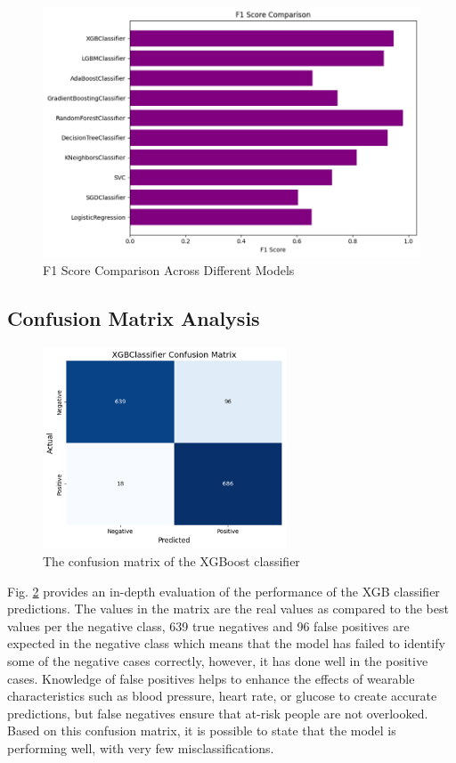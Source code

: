 \documentclass[conference]{IEEEtran}
\begin{document}
\begin{figure}[h]
\centerline{
\includegraphics[width=0.5 \textwidth]{Picture3.png}}
\caption{F1 Score Comparison Across Different Models}
\label{fig:2}
\end{figure}

\subsection{\textbf{Confusion Matrix Analysis}}


\begin{figure}[h]
\centerline{
\includegraphics[height=6cm, width=0.5 \textwidth]{Picture4.png}}
\caption{The confusion matrix of the XGBoost classifier}
\label{fig:3}
\end{figure}



Fig. \ref{fig:3} provides an in-depth evaluation of the performance of the XGB classifier predictions. The values in the matrix are the real values as compared to the best values per the negative class, 639 true negatives and 96 false positives are expected in the negative class which means that the model has failed to identify some of the negative cases correctly, however, it has done well in the positive cases. Knowledge of false positives helps to enhance the effects of wearable characteristics such as blood pressure, heart rate, or glucose to create accurate predictions, but false negatives ensure that at-risk people are not overlooked. Based on this confusion matrix, it is possible to state that the model is performing well, with very few misclassifications.
\end{document}
